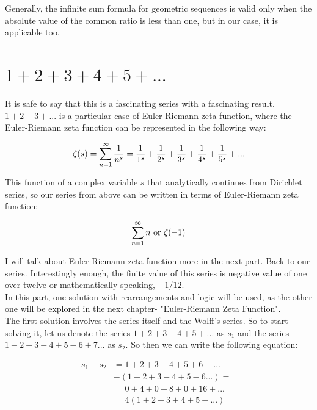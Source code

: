 \documentclass[a4paper]{article}
\begin{document}
Generally, the infinite sum formula for geometric sequences is valid only when the absolute value
of the common ratio is less than one, but in our case, it is applicable too.
\newpage
\section {$1+2+3+4+5+...$}

It is safe to say that this is a fascinating series with a fascinating result. $1+2+3+...$ is a particular
case of Euler-Riemann zeta function, where the Euler-Riemann zeta function can be represented in
the following way:

\begin{equation}
  \zeta(s)=\sum_{n=1}^{\infty} \frac{1}{n^s}=\frac{1}{1^s}+\frac{1}{2^s}+\frac{1}{3^s}+
  \frac{1}{4^s}+\frac{1}{5^s}+...\\
  \label{zetaf}
\end{equation}

This function of a complex variable $s$ that analytically continues from Dirichlet series, so our series
from above can be written in terms of Euler-Riemann zeta function:

\begin{equation}
  \sum_{n=1}^{\infty} n \text{ or } \zeta(-1)\\
  \end{equation}

I will talk about Euler-Riemann zeta function more in the next part. Back to our series. Interestingly enough,
the finite value of this series is negative value of one over twelve or mathematically speaking,
$-1/12$.\\

In this part, one solution with rearrangements and logic will be used, as the other one will be
explored in the next chapter- "Euler-Riemann Zeta Function".\\

The first solution involves the series itself and the Wolff's series. So to start solving it, let us denote
the series $1+2+3+4+5+...$ as $s_1$ and the series $1-2+3-4+5-6+7...$ as $s_2$. So then
we can write the following equation:

\begin{align*}
  s_1-s_2&=1+2+3+4+5+6+...\\
  &-(1-2+3-4+5-6...)=\\
  &=0+4+0+8+0+16+...=\\
  &=4(1+2+3+4+5+...)=
\end{align*}
\end{document}
